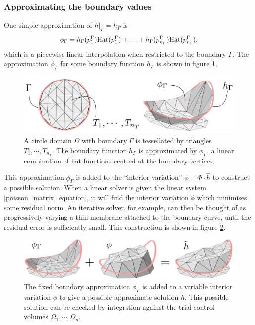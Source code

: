 \subsubsection{Approximating the boundary values}
One simple approximation of $\left.h\right|_\Gamma = h_\Gamma$ is
$$
    \phi_\Gamma = h_\Gamma(p^\Gamma_1)\text{Hat}(p^\Gamma_1)
                + \cdots
                + h_\Gamma(p^\Gamma_{n_\Gamma})\text{Hat}(p^\Gamma_{n_\Gamma}),
$$
which is a piecewise linear interpolation when restricted to the boundary $\Gamma$. The approximation $\phi_\Gamma$ for some boundary
function $h_\Gamma$ is shown in figure \ref{boundary}.
\begin{figure}[H]
    \begin{center}
        \includegraphics[width=0.9\linewidth]{figures/boundary/boundary.png}
    \end{center}
    \caption{\scriptsize
        A circle domain $\Omega$ with boundary $\Gamma$ is tessellated by triangles $T_1,\cdots,T_{n_T}$.
        The boundary function $h_\Gamma$ is approximated by $\phi_\Gamma$, a linear combination of hat functions centred at the boundary vertices.
    }
    \label{boundary}
\end{figure}
This approximation $\phi_\Gamma$ is added to the ``interior variation'' $\phi = \Phi\cdot\hat{h}$ to construct a possible solution.
When a linear solver is given the linear system \eqref{poisson_matrix_equation}, it will find the interior variation $\phi$
which minimises some residual norm. An iterative solver, for example, can then be thought of as progressively varying a thin membrane attached
to the boundary curve,
until the residual error is sufficiently small. This construction is shown in figure \ref{laplaceboundary}.
\begin{figure}[H]
    \begin{center}
        \includegraphics[width=1\linewidth]{figures/laplaceboundary/laplaceboundaryv2.png}
    \end{center}
    \caption{\scriptsize
        The fixed boundary approximation $\phi_\Gamma$ is added to a variable interior variation $\phi$ to give a possible approximate solution $\tilde{h}$.
        This possible solution can be checked by integration against the trial control volumes $\Omega_1,\cdots,\Omega_n$.
    }
    \label{laplaceboundary}
\end{figure}
